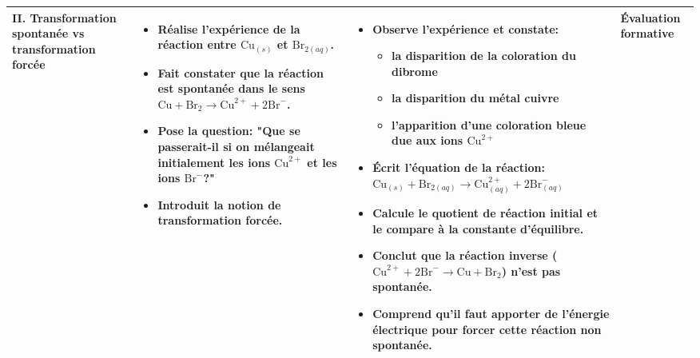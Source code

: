 \documentclass[12pt]{article}
\begin{document}
\begin{tabularx}{\textwidth}{|p{3.5cm}|X|X|p{2.5cm}|}
\textbf{II. Transformation spontanée vs transformation forcée} 
& 
\begin{itemize}[leftmargin=*]
   \item Réalise l'expérience de la réaction entre $\text{Cu}_{(s)}$ et $\text{Br}_{2(aq)}$.
    \item Fait constater que la réaction est spontanée dans le sens $\text{Cu} + \text{Br}_2 \rightarrow \text{Cu}^{2+} + 2\text{Br}^-$.
    \item Pose la question: "Que se passerait-il si on mélangeait initialement les ions $\text{Cu}^{2+}$ et les ions $\text{Br}^-$?"
    \item Introduit la notion de transformation forcée.
\end{itemize} & 
\begin{itemize}[leftmargin=*]
\item Observe l'expérience et constate:
    \begin{itemize}
        \item la disparition de la coloration du dibrome
        \item la disparition du métal cuivre
        \item l'apparition d'une coloration bleue due aux ions $\text{Cu}^{2+}$
    \end{itemize}
    \item Écrit l'équation de la réaction: $\text{Cu}_{(s)} + \text{Br}_{2(aq)} \rightarrow \text{Cu}^{2+}_{(aq)} + 2\text{Br}^-_{(aq)}$
    \item Calcule le quotient de réaction initial et le compare à la constante d'équilibre.
    \item Conclut que la réaction inverse ($\text{Cu}^{2+} + 2\text{Br}^- \rightarrow \text{Cu} + \text{Br}_2$) n'est pas spontanée.
    \item Comprend qu'il faut apporter de l'énergie électrique pour forcer cette réaction non spontanée.
\end{itemize}

& 
Évaluation formative \\
\hline

\end{tabularx}
\end{document}
